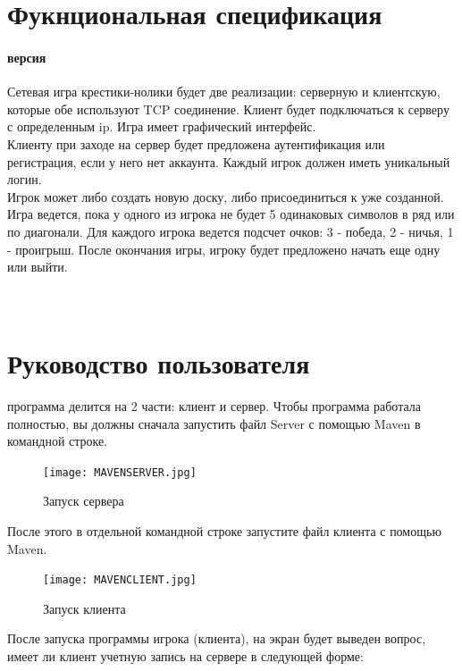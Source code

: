 \documentclass[a4paper,14pt]{extarticle} %
\begin{document}
\newpage
\section*{Фукнциональная спецификация}
\paragraph{ версия\\}
\normalsize
Сетевая игра крестики-нолики будет две реализации: серверную и клиентскую, которые обе используют TCP соединение. Клиент будет подключаться к серверу с определенным ip. Игра имеет графический интерфейс.\\ 
Клиенту при заходе на сервер будет предложена аутентификация или регистрация, если у него нет аккаунта. Каждый игрок должен иметь уникальный логин.\\
Игрок может либо создать новую доску, либо присоединиться к уже созданной. Игра ведется, пока у одного из игрока не будет 5 одинаковых символов в ряд или по диагонали. Для каждого игрока ведется подсчет очков: 3 - победа, 2 - ничья, 1 - проигрыш. После окончания игры, игроку будет предложено начать еще одну или выйти. 


\vspace{1cm}
\paragraph{\large\\}
\normalsize


\newpage
\section*{Руководство пользователя}
 программа делится на 2 части: клиент и сервер. Чтобы программа работала полностью, вы должны сначала запустить файл Server с помощью Maven в командной строке. 
\begin{figure}[h]
\centering
\texttt{[image: MAVENSERVER.jpg]}
\caption{Запуск сервера}
\label{fig:mpr}
\end{figure}

После этого в отдельной  командной  строке  запустите  файл клиента с помощью Maven.
\begin{figure}[h]
	\centering
	\texttt{[image: MAVENCLIENT.jpg]}
	\caption{Запуск клиента}
	\label{fig:mpr}
\end{figure}

\newpage

После запуска  программы игрока (клиента), на экран будет выведен вопрос, имеет ли клиент учетную запись на сервере в следующей форме:
\end{document}
